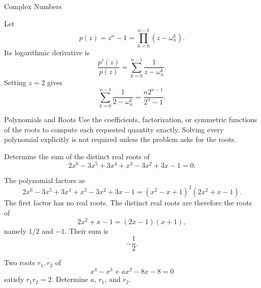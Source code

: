 \begin{expectedproblemgroup}{Complex Numbers}
        \begin{expectedsubsolution}
            Let
            \[
                p(z)=z^n-1
                =
                \prod_{k=0}^{n-1}(z-\omega_n^k).
            \]
            Its logarithmic derivative is
            \[
                \frac{p'(z)}{p(z)}
                =
                \sum_{k=0}^{n-1}\frac{1}{z-\omega_n^k}.
            \]
            Setting $z=2$ gives
            \[
                \boxed{
                    \sum_{k=0}^{n-1}\frac{1}{2-\omega_n^k}
                    =
                    \frac{n2^{n-1}}{2^n-1}
                }.
            \]
        \end{expectedsubsolution}

    \end{expectedproblemgroup}

    \begin{expectedproblemgroup}{Polynomials and Roots}
        Use the coefficients, factorization, or symmetric functions of the roots
        to compute each requested quantity exactly. Solving every polynomial
        explicitly is not required unless the problem asks for the roots.

        \begin{expectedsubproblem}[2006 HMMT]
            Determine the sum of the distinct real roots of
            \[
                2x^6-3x^5+3x^4+x^3-3x^2+3x-1=0.
            \]
        \end{expectedsubproblem}

        \begin{expectedsubsolution}
            The polynomial factors as
            \[
                2x^6-3x^5+3x^4+x^3-3x^2+3x-1
                =
                (x^2-x+1)^2(2x^2+x-1).
            \]
            The first factor has no real roots. The distinct real roots are therefore
            the roots of
            \[
                2x^2+x-1=(2x-1)(x+1),
            \]
            namely $1/2$ and $-1$. Their sum is
            \[
                \boxed{-\frac12}.
            \]
        \end{expectedsubsolution}

        \begin{expectedsubproblem}[1997 VTRMC]
            Two roots $r_1,r_2$ of
            \[
                x^4-x^3+ax^2-8x-8=0
            \]
            satisfy $r_1r_2=2$. Determine $a$, $r_1$, and $r_2$.
        \end{expectedsubproblem}


\end{expectedproblemgroup}
